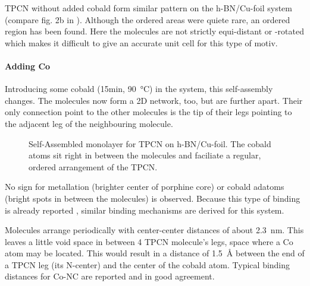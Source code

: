 TPCN without added cobald form similar pattern on the h-BN/Cu-foil system (compare fig. 2b in \cite{urgel_controlling_2015}). Although the ordered areas were quiete rare, an ordered region has been found. Here the molecules are not strictly equi-distant or -rotated which makes it difficult to give an accurate unit cell for this type of motiv.

\newpage
\paragraph{Adding Co}
Introducing some cobald (15min, \SI{90}{\celsius}) in the system, this self-assembly changes. The molecules now form a 2D network, too, but are further apart. Their only connection point to the other molecules is the tip of their legs pointing to the adjacent leg of the neighbouring molecule.

\begin{figure}[!h]
 \centering
\caption{Self-Assembled monolayer for TPCN on h-BN/Cu-foil. The cobald atoms sit right in between the molecules and faciliate a regular, ordered arrangement of the TPCN.}
\end{figure}

No sign for metallation (brighter center of porphine core) or cobald adatoms (bright spots in between the molecules) is observed. Because this type of binding is already reported \cite{urgel_controlling_2015}, similar binding mechanisms are derived for this system.

Molecules arrange periodically with center-center distances of about \SI{2.3}{\nano \meter}. This leaves a little void space in between 4 TPCN molecule's legs, space where a Co atom may be located. This would result in a distance of \SI{1.5}{\angstrom} between the end of a TPCN leg (its N-center) and the center of the cobald atom. Typical binding distances for Co-NC are reported \cite{schlickum_metalorganic_2007, przychodzen_supramolecular_2006} and in good agreement.

